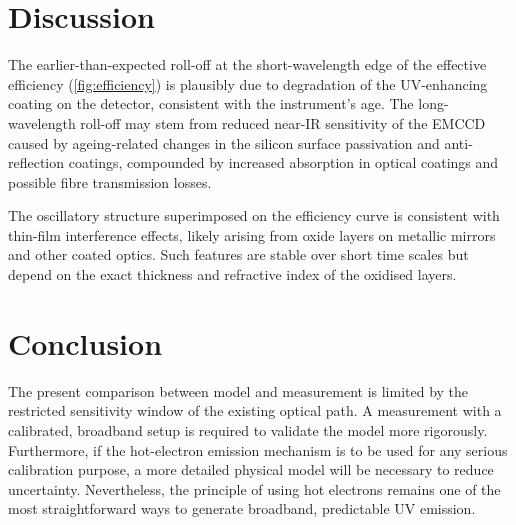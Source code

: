 \documentclass[
	parskip=half,
	a4paper,
]{scrarticle}
\begin{document}
\section{Discussion}
The earlier-than-expected roll-off at the short-wavelength edge of the effective efficiency (\autoref{fig:efficiency}) is plausibly due to degradation of the UV-enhancing coating on the detector, consistent with the instrument’s age. The long-wavelength roll-off may stem from reduced near-IR sensitivity of the EMCCD caused by ageing-related changes in the silicon surface passivation and anti-reflection coatings, compounded by increased absorption in optical coatings and possible fibre transmission losses.  

The oscillatory structure superimposed on the efficiency curve is consistent with thin-film interference effects, likely arising from oxide layers on metallic mirrors and other coated optics. 
Such features are stable over short time scales but depend on the exact thickness and refractive index of the oxidised layers.

\section{Conclusion}
The present comparison between model and measurement is limited by the restricted sensitivity window of the existing optical path. A measurement with a calibrated, broadband setup is required to validate the model more rigorously. Furthermore, if the hot-electron emission mechanism is to be used for any serious calibration purpose, a more detailed physical model will be necessary to reduce uncertainty.  
Nevertheless, the principle of using hot electrons remains one of the most straightforward ways to generate broadband, predictable UV emission.


\clearpage
\printbibliography
\end{document}
